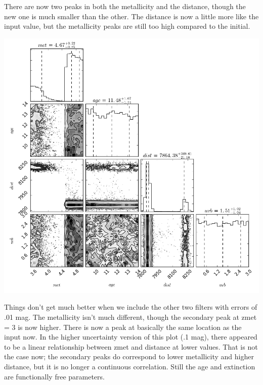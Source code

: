 \documentclass[letterpaper,12pt]{article}
\begin{document}
There are now two peaks in both the metallicity and the distance, though the new one is much smaller than the other. The distance is now a little more like the input value, but the metallicity peaks are still too high compared to the initial.

\includegraphics[width=5.5in]{corner31}

Things don't get much better when we include the other two filters with errors of .01 mag. The metallicity isn't much different, though the secondary peak at zmet = 3 is now higher. There is now a peak at basically the same location as the input now. In the higher uncertainty version of this plot (.1 mag), there appeared to be a linear relationship between zmet and distance at lower values. That is not the case now; the secondary peaks do correspond to lower metallicity and higher distance, but it is no longer a continuous correlation. Still the age and extinction are functionally free parameters. 
\end{document}
